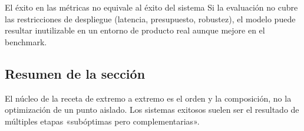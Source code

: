\begin{warningbox}{El éxito en las métricas no equivale al éxito del sistema}
Si la evaluación no cubre las restricciones de despliegue (latencia, presupuesto, robustez), el modelo puede resultar inutilizable en un entorno de producto real aunque mejore en el benchmark.
\end{warningbox}

\subsection{Resumen de la sección}
El núcleo de la receta de extremo a extremo es el orden y la composición, no la optimización de un punto aislado. Los sistemas exitosos suelen ser el resultado de múltiples etapas «subóptimas pero complementarias».


